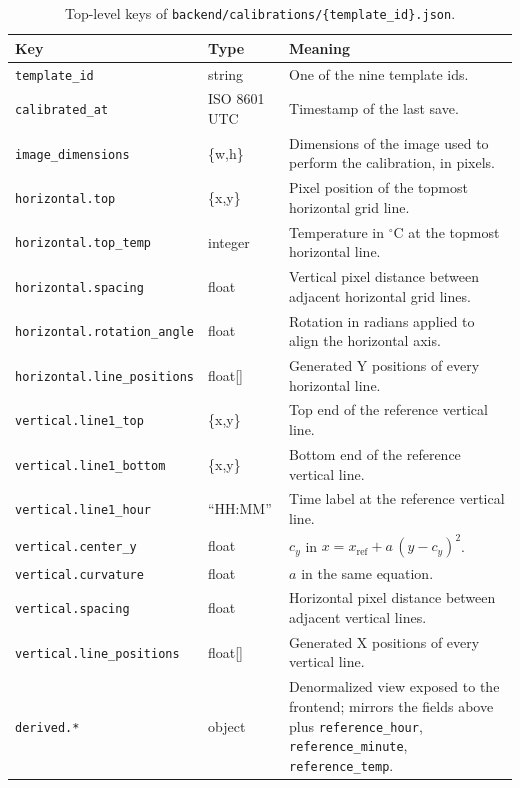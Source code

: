 \documentclass[a4paper,12pt]{report}
\begin{document}
\begin{table}[h!]
\caption[Calibration JSON schema]{Top-level keys of \texttt{backend/calibrations/\{template\_id\}.json}.}
\begin{center}
\footnotesize
\renewcommand{\arraystretch}{1.0}
\begin{tabular}{|l|l|p{6.8cm}|} \hline
\textbf{Key} & \textbf{Type} & \textbf{Meaning} \\\hline
\texttt{template\_id}        & string & One of the nine template ids. \\\hline
\texttt{calibrated\_at}      & ISO 8601 UTC & Timestamp of the last save. \\\hline
\texttt{image\_dimensions}   & \{w,h\} & Dimensions of the image used to perform the calibration, in pixels. \\\hline
\texttt{horizontal.top}      & \{x,y\} & Pixel position of the topmost horizontal grid line. \\\hline
\texttt{horizontal.top\_temp} & integer & Temperature in $^\circ$C at the topmost horizontal line. \\\hline
\texttt{horizontal.spacing}  & float   & Vertical pixel distance between adjacent horizontal grid lines. \\\hline
\texttt{horizontal.rotation\_angle} & float & Rotation in radians applied to align the horizontal axis. \\\hline
\texttt{horizontal.line\_positions} & float[] & Generated Y positions of every horizontal line. \\\hline
\texttt{vertical.line1\_top}    & \{x,y\} & Top end of the reference vertical line. \\\hline
\texttt{vertical.line1\_bottom} & \{x,y\} & Bottom end of the reference vertical line. \\\hline
\texttt{vertical.line1\_hour}   & ``HH:MM'' & Time label at the reference vertical line. \\\hline
\texttt{vertical.center\_y}   & float & $c_y$ in $x = x_{\text{ref}} + a\,(y-c_y)^2$. \\\hline
\texttt{vertical.curvature}   & float & $a$ in the same equation. \\\hline
\texttt{vertical.spacing}     & float & Horizontal pixel distance between adjacent vertical lines. \\\hline
\texttt{vertical.line\_positions} & float[] & Generated X positions of every vertical line. \\\hline
\texttt{derived.*}            & object  & Denormalized view exposed to the frontend; mirrors the fields above plus \texttt{reference\_hour}, \texttt{reference\_minute}, \texttt{reference\_temp}. \\\hline
\end{tabular}
\label{table:cal-schema}
\end{center}
\end{table}
\end{document}
